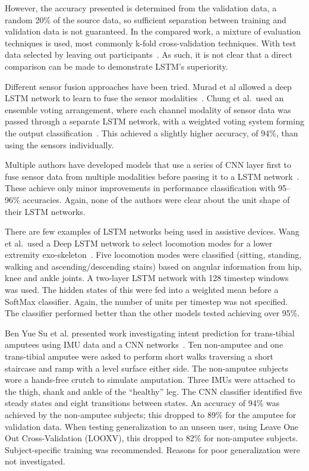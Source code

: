 However, the accuracy presented is determined from the validation data, a random 20\% of the source data, so sufficient separation between training and validation data is not guaranteed. In the compared work, a mixture of evaluation techniques is used, most commonly k-fold cross-validation techniques. With test data selected by leaving out participants~\cite{Koller2018, Sprager2015}. As such, it is not clear that a direct comparison can be made to demonstrate LSTM's superiority.

Different sensor fusion approaches have been tried. Murad et al allowed a deep LSTM network to learn to fuse the sensor modalities~\cite{Murad2017}. Chung et al.~used an ensemble voting arrangement, where each channel modality of sensor data was passed through a separate LSTM network, with a weighted voting system forming the output classification~\cite{Chung2019}. This achieved a slightly higher accuracy, of 94\%, than using the sensors individually.

Multiple authors have developed models that use a series of CNN layer first to fuse sensor data from multiple modalities before passing it to a LSTM network~\cite{Abbaspour2020, Ihianle2020, Mutegeki2020, Wang2020, Mekruksavanich2020}. These achieve only minor improvements in performance classification with 95--96\% accuracies. Again, none of the authors were clear about the unit shape of their LSTM networks.

There are few examples of LSTM networks being used in assistive devices. Wang et al.~used a Deep LSTM network to select locomotion modes for a lower extremity exo-skeleton~\cite{Wang2018}. Five locomotion modes were classified (sitting, standing, walking and ascending/descending stairs) based on angular information from hip, knee and ankle joints. A two-layer LSTM network with 128 timestep windows was used. The hidden states of this were fed into a weighted mean before a SoftMax classifier. Again, the number of units per timestep was not specified. The classifier performed better than the other models tested achieving over 95\%.

Ben Yue Su et al. presented work investigating intent prediction for trans-tibial amputees using IMU data and a CNN networks~\cite{Su2019}. Ten non-amputee and one trans-tibial amputee were asked to perform short walks traversing a short staircase and ramp with a level surface either side. The non-amputee subjects wore a hands-free crutch to simulate amputation. Three IMUs were attached to the thigh, shank and ankle of the ``healthy'' leg. The CNN classifier identified five steady states and eight transitions between states. An accuracy of 94\% was achieved by the non-amputee subjects; this dropped to 89\% for the amputee for validation data. When testing generalization to an unseen user, using Leave One Out Cross-Validation (LOOXV), this dropped to 82\% for non-amputee subjects. Subject-specific training was recommended. Reasons for poor generalization were not investigated.

